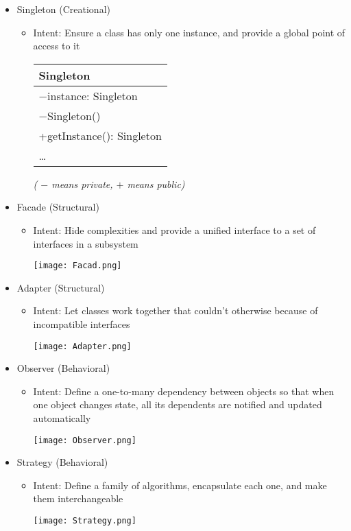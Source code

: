 \documentclass[11pt]{article}
\begin{document}
\begin{itemize}
	\item Singleton (Creational)
		\begin{itemize}
			\item Intent: Ensure a class has only one instance, and provide a global point of access to it\\
			\begin{center}
				\begin{tabular}{| l |}
				\hline
				Singleton\\
				\hline
				$ - $instance: Singleton\\
				\hline
				$ - $Singleton()\\
				+getInstance(): Singleton\\
				\ldots\\
				\hline
			\end{tabular}	\textit{	( $ - $ means private, $ + $ means public)}
			\end{center}
		\end{itemize}
%
	\item Facade (Structural)
		\begin{itemize}
			\item Intent: Hide complexities and provide a unified interface to a set of interfaces in a subsystem\\[-10pt]
				\begin{center}
					\texttt{[image: Facad.png]}
				\end{center}
		\end{itemize}
	\newpage
	\item Adapter (Structural)
		\begin{itemize}
			\item Intent: Let classes work together that couldn't otherwise because of incompatible interfaces\\[-10pt]
				\begin{center}
					\texttt{[image: Adapter.png]}
				\end{center}
		\end{itemize}

	\item Observer (Behavioral)
		\begin{itemize}
			\item Intent: Define a one-to-many dependency between objects so that when one object changes state, all its dependents are notified and updated automatically\\[-10pt]
				\begin{center}
					\texttt{[image: Observer.png]}
				\end{center}
		\end{itemize}
	\item Strategy (Behavioral)
		\begin{itemize}
			\item Intent: Define a family of algorithms, encapsulate each one, and make them interchangeable\\[-10pt]
			\begin{center}
				\texttt{[image: Strategy.png]}
			\end{center}
		\end{itemize}
\end{itemize}
\end{document}
